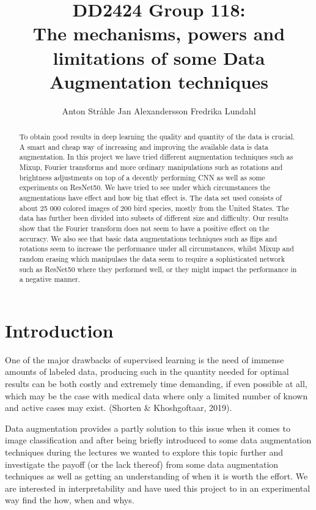 \documentclass{article}
\title{DD2424 Group 118: \\ The mechanisms, powers and limitations of some Data Augmentation techniques}
\author{%
  Anton Stråhle \And Jan Alexandersson \And Fredrika Lundahl}
\begin{document}
	
\maketitle

\begin{abstract}


To obtain good results in deep learning the quality and quantity of the data is crucial. A smart and cheap way of increasing and 
improving the available data is data augmentation. In this project we have tried different 
augmentation techniques such as Mixup, Fourier transforms and more ordinary manipulations 
such as rotations and brightness adjustments on top of a decently performing CNN as well as some experiments on 
ResNet50. We have tried to see under which circumstances the augmentations have effect and how big that 
effect is. The data set used consists of about 25 000 colored images of 200 bird species, mostly from the United States. 
The data has further been divided into subsets of different size and difficulty. Our results show that the 
Fourier transform does not seem to have a positive effect on the accuracy. 
We also see that basic data augmentations techniques such as flips and rotations seem to increase the performance under all circumstances, whilst Mixup and random erasing which manipulaes the data seem to require a sophisticated network such as ResNet50 where they performed well, or they might impact the performance in a negative manner.


\end{abstract}

\section{Introduction}

% 

One of the major drawbacks of supervised learning is the need of immense amounts of labeled data, producing such in the quantity needed for optimal results can be both costly and extremely time demanding, if even possible at all, which may be the case with medical data where only a limited number of known and active cases may exist.  (Shorten \& Khoshgoftaar, 2019). 

Data augmentation provides a partly solution to this issue when it comes to image classification and after being briefly introduced to some data augmentation techniques during the lectures we wanted to explore this topic further and investigate the payoff (or the lack thereof) from some data augmentation techniques as well as getting an understanding of when it is worth the effort. We are interested in interpretability and have used this project to in an experimental way find the how, when and whys. 
\end{document}
